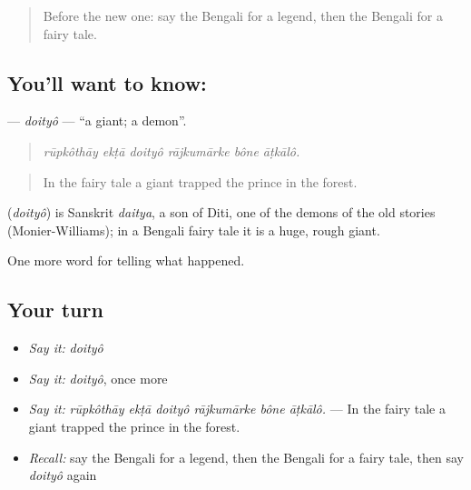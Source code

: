 \label{lesson:BN-C321-doityo}



\begin{quote}
Before the new one: say the Bengali for a legend, then the Bengali for a fairy tale.
\end{quote}

\subsection*{You'll want to know: }
\textbf{} — \emph{doityô} — \textquotedblleft{}a giant; a demon\textquotedblright{}.

\begin{quote}
     
\end{quote}

\begin{quote}
\emph{rūpkôthāy ekṭā doityô rājkumārke bône āṭkālô.}
\end{quote}

\begin{quote}
In the fairy tale a giant trapped the prince in the forest.
\end{quote}

\begin{cousinweb}
\textbf{} (\emph{doityô}) is Sanskrit \emph{daitya}, a son of Diti, one of the demons of the old stories (Monier-Williams); in a Bengali fairy tale it is a huge, rough giant.
\end{cousinweb}

\begin{grammarlens}[title={What you've built}]
One more word for telling what happened.
\end{grammarlens}

\subsection*{Your turn}
\begin{itemize}
\raggedright
  \item \emph{Say it:} \emph{doityô}
  \item \emph{Say it:} \emph{doityô}, once more
  \item \emph{Say it:} \emph{rūpkôthāy ekṭā doityô rājkumārke bône āṭkālô.} — In the fairy tale a giant trapped the prince in the forest.
  \item \emph{Recall:} say the Bengali for a legend, then the Bengali for a fairy tale, then say \emph{doityô} again
\end{itemize}

